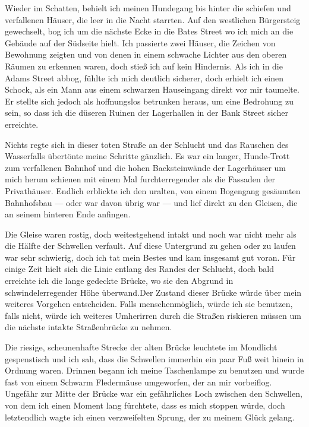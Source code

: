 Wieder im Schatten, behielt ich meinen Hundegang bis hinter die schiefen und verfallenen Häuser, die leer in die Nacht starrten. Auf den westlichen Bürgersteig gewechselt, bog ich um die nächste Ecke in die Bates Street wo ich mich an die Gebäude auf der Südseite hielt. Ich passierte zwei Häuser, die Zeichen von Bewohnung zeigten und von denen in einem schwache Lichter aus den oberen Räumen zu erkennen waren, doch stieß ich auf kein Hindernis. Als ich in die Adams Street abbog, fühlte ich mich deutlich sicherer, doch erhielt ich einen Schock, als ein Mann aus einem schwarzen Hauseingang direkt vor mir taumelte. Er stellte sich jedoch als hoffnungslos betrunken heraus, um eine Bedrohung zu sein, so dass ich die düseren Ruinen der Lagerhallen in der Bank Street sicher erreichte.

Nichts regte sich in dieser toten Straße an der Schlucht und das Rauschen des Wasserfalls übertönte meine Schritte gänzlich. Es war ein langer, Hunde-Trott zum verfallenen Bahnhof und die hohen Backsteinwände der Lagerhäuser um mich herum schienen mit einem Mal furchterregender als die Fassaden der Privathäuser. Endlich erblickte ich den uralten, von einem Bogengang gesäumten Bahnhofsbau --- oder war davon übrig war --- und lief direkt zu den Gleisen, die an seinem hinteren Ende anfingen.

Die Gleise waren rostig, doch weitestgehend intakt und noch war nicht mehr als die Hälfte der Schwellen verfault. Auf diese Untergrund zu gehen oder zu laufen war sehr schwierig, doch ich tat mein Bestes und kam insgesamt gut voran. Für einige Zeit hielt sich die Linie entlang des Randes der Schlucht, doch bald erreichte ich die lange gedeckte Brücke, wo sie den Abgrund in schwindelerregender Höhe überwand.Der Zustand dieser Brücke würde über mein weiteres Vorgehen entscheiden. Falls menschenmöglich, würde ich sie benutzen, falls nicht, würde ich weiteres Umherirren durch die Straßen riskieren müssen um die nächste intakte Straßenbrücke zu nehmen.

Die riesige, scheunenhafte Strecke der alten Brücke leuchtete im Mondlicht gespenstisch und ich sah, dass die Schwellen immerhin ein paar Fuß weit hinein in Ordnung waren. Drinnen begann ich meine Taschenlampe zu benutzen und wurde fast von einem Schwarm Fledermäuse umgeworfen, der an mir vorbeiflog. Ungefähr zur Mitte der Brücke war ein gefährliches Loch zwischen den Schwellen, von dem ich einen Moment lang fürchtete, dass es mich stoppen würde, doch letztendlich wagte ich einen verzweifelten Sprung, der zu meinem Glück gelang.

